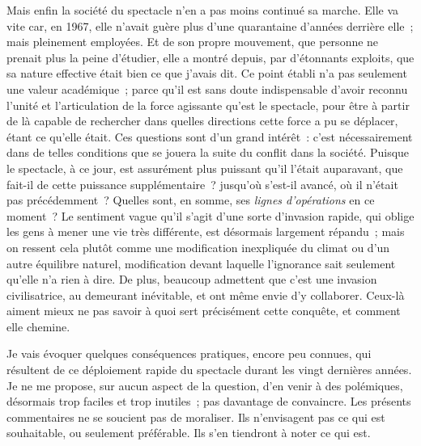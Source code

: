\documentclass[french,twoside]{book} %
\def\bignobreak{\ifdim\lastskip<\bigskipamount
  \removelastskip\nopagebreak\bigskip\fi}
\newcommand{\labelblock}[1]{\bigbreak{\color{rubric}\noindent\textbf{#1}\par}\bignobreak}
\begin{document}
Mais enfin la société du spectacle n’en a pas moins continué sa marche. Elle va vite car, en 1967, elle n’avait guère plus d’une quarantaine d’années derrière elle ; mais pleinement employées. Et de son propre mouvement, que personne ne prenait plus la peine d’étudier, elle a montré depuis, par d’étonnants exploits, que sa nature effective était bien ce que j’avais dit. Ce point établi n’a pas seulement une valeur académique ; parce qu’il est sans doute indispensable d’avoir reconnu l’unité et l’articulation de la force agissante qu’est le spectacle, pour être à partir de là capable de rechercher dans quelles directions cette force a pu se déplacer, étant ce qu’elle était. Ces questions sont d’un grand intérêt : c’est nécessairement dans de telles conditions que se jouera la suite du conflit dans la société. Puisque le spectacle, à ce jour, est assurément plus puissant qu’il l’était auparavant, que fait-il de cette puissance supplémentaire ? jusqu’où s’est-il avancé, où il n’était pas précédemment ? Quelles sont, en somme, ses \emph{lignes d’opérations} en ce moment ? Le sentiment vague qu’il s’agit d’une sorte d’invasion rapide, qui oblige les gens à mener une vie très différente, est désormais largement répandu ; mais on ressent cela plutôt comme une modification inexpliquée du climat ou d’un autre équilibre naturel, modification devant laquelle l’ignorance sait seulement qu’elle n’a rien à dire. De plus, beaucoup admettent que c’est une invasion civilisatrice, au demeurant inévitable, et ont même envie d’y collaborer. Ceux-là aiment mieux ne pas savoir à quoi sert précisément cette conquête, et comment elle chemine.\par
Je vais évoquer quelques conséquences pratiques, encore peu connues, qui résultent de ce déploiement rapide du spectacle durant les vingt dernières années. Je ne me propose, sur aucun aspect de la question, d’en venir à des polémiques, désormais trop faciles et trop inutiles ; pas davantage de convaincre. Les présents commentaires ne se soucient pas de moraliser. Ils n’envisagent pas ce qui est souhaitable, ou seulement préférable. Ils s’en tiendront à noter ce qui est.\par

\labelblock{III}
\end{document}
